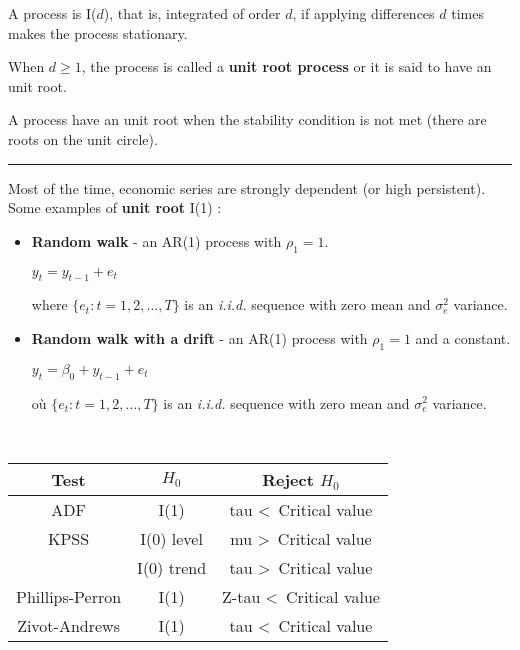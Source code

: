   \begin{f}

A process is I($d$), that is, integrated of order $d$, if applying differences $d$ times makes the process stationary.

When $d \geq 1$, the process is called a \textbf{unit root process} or it is said to have an unit root.

A process have an unit root when the stability condition is not met (there are roots on the unit circle).

\end{f}  \hrule  

\begin{f}

Most of the time, economic series are strongly dependent (or high persistent). Some examples of \textbf{unit root} I(1) :

\begin{itemize}[leftmargin=*]
	\item \textbf{Random walk} - an AR(1) process with $\rho_{1} = 1$.
	
	\begin{center}
		$y_{t} = y_{t - 1} + e_{t}$
	\end{center}
	
	where $\lbrace e_{t} : t = 1, 2, \ldots, T \rbrace$ is an \textsl{i.i.d.} sequence with zero mean and $\sigma^{2}_{e}$ variance.
	
	\item \textbf{Random walk with a drift} - an AR(1) process with $\rho_{1} = 1$ and a constant.
	
	\begin{center}
		$y_{t} = \beta_{0} + y_{t - 1} + e_{t}$
	\end{center}
	
	où $\lbrace e_{t} : t = 1, 2, \ldots, T \rbrace$ is an \textsl{i.i.d.} sequence with zero mean and $\sigma^{2}_{e}$ variance.
\end{itemize}

\end{f} 

 \begin{f}{\ }

\begin{center}
	\begin{tabular}{ c | c | c }
		Test            & $H_{0}$    & Reject $H_{0}$                     \\ \hline
		ADF             & I(1)       & tau \textless \, Critical value    \\ \hline
		KPSS            & I(0) level & mu \textgreater \, Critical value  \\
		& I(0) trend & tau \textgreater \, Critical value \\ \hline
		Phillips-Perron & I(1)       & Z-tau \textless \, Critical value  \\ \hline
		Zivot-Andrews   & I(1)       & tau \textless \, Critical value
	\end{tabular}
\end{center}
\medskip

\end{f}  

